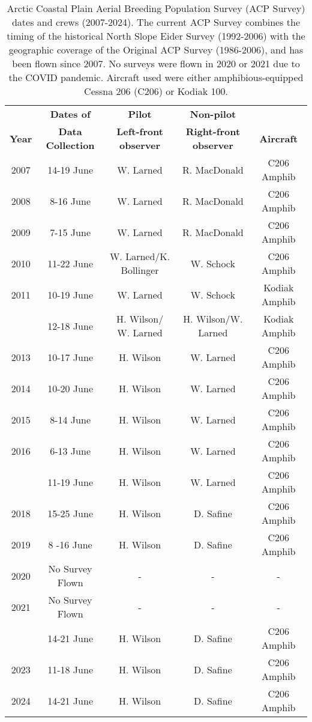 \documentclass[
]{article}
\begin{document}
\begin{longtable}[t]{ccccc}

\caption{\label{tbl-crew}Arctic Coastal Plain Aerial Breeding Population
Survey (ACP Survey) dates and crews (2007-2024). The current ACP Survey
combines the timing of the historical North Slope Eider Survey
(1992-2006) with the geographic coverage of the Original ACP Survey
(1986-2006), and has been flown since 2007. No surveys were flown in
2020 or 2021 due to the COVID pandemic. Aircraft used were either
amphibious-equipped Cessna 206 (C206) or Kodiak 100.}

\tabularnewline

\\
\toprule
\multicolumn{1}{c}{\textbf{ }} & \multicolumn{1}{c}{\textbf{Dates of}} & \multicolumn{1}{c}{\textbf{Pilot}} & \multicolumn{1}{c}{\textbf{Non-pilot}} & \multicolumn{1}{c}{\textbf{ }} \\
\cmidrule(l{3pt}r{3pt}){2-2} \cmidrule(l{3pt}r{3pt}){3-3} \cmidrule(l{3pt}r{3pt}){4-4}
\textbf{Year} & \textbf{Data Collection} & \textbf{Left-front observer} & \textbf{Right-front observer} & \textbf{Aircraft}\\
\midrule
2007 & 14-19 June & W. Larned & R. MacDonald & C206 Amphib\\
2008 & 8-16 June & W. Larned & R. MacDonald & C206 Amphib\\
2009 & 7-15 June & W. Larned & R. MacDonald & C206 Amphib\\
2010 & 11-22 June & W. Larned/K. Bollinger & W. Schock & C206 Amphib\\
2011 & 10-19 June & W. Larned & W. Schock & Kodiak Amphib\\
\addlinespace
2012 & 12-18 June & H. Wilson/ W. Larned & H. Wilson/W. Larned & Kodiak Amphib\\
2013 & 10-17 June & H. Wilson & W. Larned & C206 Amphib\\
2014 & 10-20 June & H. Wilson & W. Larned & C206 Amphib\\
2015 & 8-14 June & H. Wilson & W. Larned & C206 Amphib\\
2016 & 6-13 June & H. Wilson & W. Larned & C206 Amphib\\
\addlinespace
2017 & 11-19 June & H. Wilson & W. Larned & C206 Amphib\\
2018 & 15-25 June & H. Wilson & D. Safine & C206 Amphib\\
2019 & 8 -16 June & H. Wilson & D. Safine & C206 Amphib\\
2020 & No Survey Flown & - & - & -\\
2021 & No Survey Flown & - & - & -\\
\addlinespace
2022 & 14-21 June & H. Wilson & D. Safine & C206 Amphib\\
2023 & 11-18 June & H. Wilson & D. Safine & C206 Amphib\\
2024 & 14-21 June & H. Wilson & D. Safine & C206 Amphib\\
\bottomrule

\end{longtable}
\end{document}
